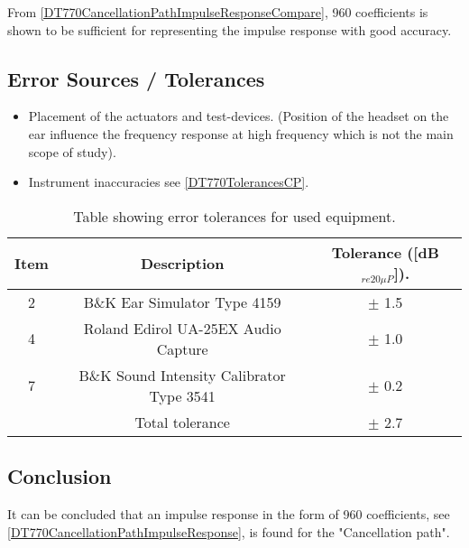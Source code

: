 From \autoref{DT770CancellationPathImpulseResponseCompare}, 960 coefficients is shown to be sufficient for representing the impulse response with good accuracy. 

\subsection{Error Sources / Tolerances}
\begin{itemize}
	\item Placement of the actuators and test-devices. (Position of the headset on the ear  influence the frequency response at high frequency which is not the main scope of study).
	\item Instrument inaccuracies see \autoref{DT770TolerancesCP}.
\end{itemize}

\begin{table}[H]
	\centering
	\begin{tabular}{ c c c } \toprule
		{Item}	& 		{Description} 	& {Tolerance ([dB$_{re20\mu P}$])}.	 \\ \bottomrule 
		2	&	B\&K Ear Simulator Type 4159				& $\pm$ 1.5 	\\
		4	&	Roland Edirol UA-25EX Audio Capture			& $\pm$ 1.0\\
		7	&	B\&K Sound Intensity Calibrator Type 3541	& $\pm$ 0.2	\\ \bottomrule
			&	Total tolerance								& $\pm$ 2.7	\\ \bottomrule	
	\end{tabular}
	\caption{Table showing error tolerances for used equipment.}
	\label{DT770TolerancesCP}
\end{table}

\subsection{Conclusion}
It can be concluded that an impulse response in the form of 960 coefficients, see \autoref{DT770CancellationPathImpulseResponse}, is found for the "Cancellation path".

